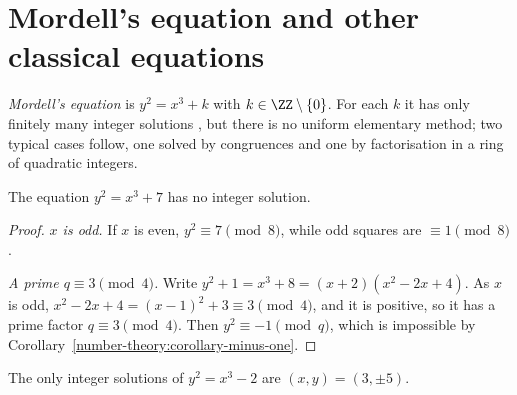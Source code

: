 \section{Mordell's equation and other classical equations}\label{diophantine-equations:section-mordell}

\emph{Mordell's equation} is $y^2 = x^3 + k$ with $k \in \ZZ \setminus \{0\}$. For each $k$ it has only finitely many integer solutions \cite{mordell-diophantine}, but there is no uniform elementary method;
two typical cases follow, one solved by congruences and one by factorisation in a ring of quadratic integers.

\begin{proposition}[Lebesgue]\label{diophantine-equations:proposition-mordell-seven}
The equation $y^2 = x^3 + 7$ has no integer solution.
\end{proposition}

\begin{proof}
\emph{$x$ is odd.} If $x$ is even, $y^2 \equiv 7 \pmod 8$, while odd squares are $\equiv 1 \pmod 8$.

\emph{A prime $q \equiv 3 \pmod 4$.} Write $y^2 + 1 = x^3 + 8 = (x + 2)(x^2 - 2x + 4)$. As $x$ is odd, $x^2 - 2x + 4 = (x - 1)^2 + 3 \equiv 3 \pmod 4$, and it is positive, so it has a prime factor
$q \equiv 3 \pmod 4$. Then $y^2 \equiv -1 \pmod q$, which is impossible by Corollary~\ref{number-theory:corollary-minus-one}.
\end{proof}

\begin{proposition}\label{diophantine-equations:proposition-mordell-two}
The only integer solutions of $y^2 = x^3 - 2$ are $(x, y) = (3, \pm5)$.
\end{proposition}

